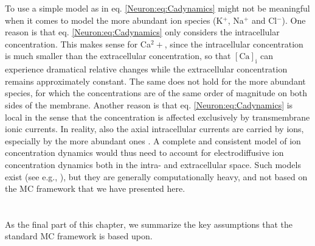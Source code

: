 To use a simple model as in eq. \ref{Neuron:eq:Cadynamics} might not be meaningful when it comes to model the more abundant ion species (K$^{+}$, Na$^{+}$ and Cl$^{-}$). One reason is that eq. \ref{Neuron:eq:Cadynamics} only considers the intracellular concentration. This makes sense for Ca$^2+$, since the intracellular concentration is much smaller than the extracellular concentration, so that $\mathrm{[Ca]_i}$ can experience dramatical relative changes while the extracellular concentration remains approximately constant. The same does not hold for the more abundant species, for which the concentrations are of the same order of magnitude on both sides of the membrane. Another reason is that eq. \ref{Neuron:eq:Cadynamics} is local in the sense that the concentration is affected exclusively by transmembrane ionic currents. In reality, also the axial intracellular currents are carried by ions, especially by the more abundant ones \cite{Qian1989}. A complete and consistent model of ion concentration dynamics would thus need to account for electrodiffusive ion concentration dynamics both in the intra- and extracellular space. Such models exist (see e.g., \cite{Saetra2020,ellingsrud2020}), but they are generally computationally heavy, and not based on the MC framework that we have presented here. 

\section{}
\label{sec:Neuron:HHCassumptions}
As the final part of this chapter, we summarize the key assumptions that the standard MC framework is based upon.

